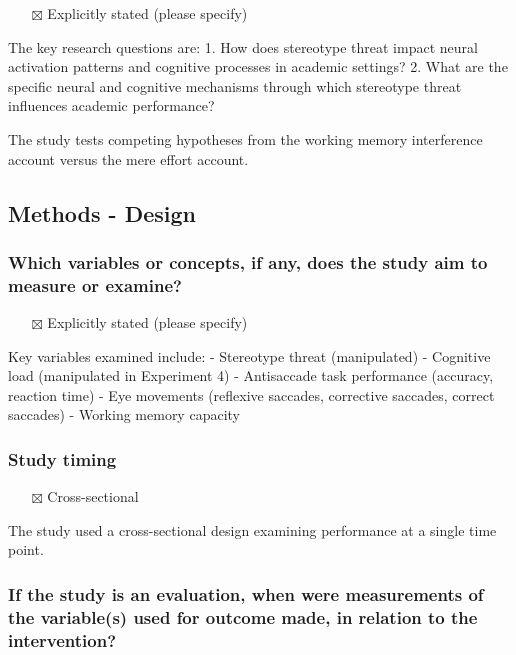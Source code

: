 \documentclass[
  doc, a4paper]{apa7}
\providecommand{\tightlist}{%
  \setlength{\itemsep}{0pt}\setlength{\parskip}{0pt}}
\begin{document}
\begin{itemize}
\tightlist
\item[$\boxtimes$]
  Explicitly stated (please specify)
\end{itemize}

The key research questions are:
1. How does stereotype threat impact neural activation patterns and cognitive processes in academic settings?
2. What are the specific neural and cognitive mechanisms through which stereotype threat influences academic performance?

The study tests competing hypotheses from the working memory interference account versus the mere effort account.

\subsection{Methods - Design}\label{methods---design}

\subsubsection{Which variables or concepts, if any, does the study aim to measure or examine?}\label{which-variables-or-concepts-if-any-does-the-study-aim-to-measure-or-examine}

\begin{itemize}
\tightlist
\item[$\boxtimes$]
  Explicitly stated (please specify)
\end{itemize}

Key variables examined include:
- Stereotype threat (manipulated)
- Cognitive load (manipulated in Experiment 4)
- Antisaccade task performance (accuracy, reaction time)
- Eye movements (reflexive saccades, corrective saccades, correct saccades)
- Working memory capacity

\subsubsection{Study timing}\label{study-timing}

\begin{itemize}
\tightlist
\item[$\boxtimes$]
  Cross-sectional
\end{itemize}

The study used a cross-sectional design examining performance at a single time point.

\subsubsection{If the study is an evaluation, when were measurements of the variable(s) used for outcome made, in relation to the intervention?}\label{if-the-study-is-an-evaluation-when-were-measurements-of-the-variables-used-for-outcome-made-in-relation-to-the-intervention}
\end{document}
